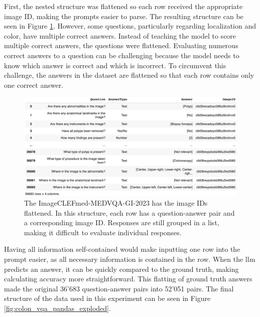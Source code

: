         First, the nested structure was flattened so each row received the appropriate image ID, making the prompts easier to parse. The resulting structure can be seen in Figure \ref{fig:colon_vqa_pandas}. However, some questions, particularly regarding localization and color, have multiple correct answers. Instead of teaching the model to score multiple correct answers, the questions were flattened. Evaluating numerous correct answers to a question can be challenging because the model needs to know which answer is correct and which is incorrect. To circumvent this challenge, the answers in the dataset are flattened so that each row contains only one correct answer.

        \begin{figure}[htb]
            \centering
            \centerline{
            \includegraphics[width=1.2\textwidth]{images/colon_vqa_pandas.png}}
            \caption{The ImageCLEFmed-MEDVQA-GI-2023 has the image IDs flattened. In this structure, each row has a question-answer pair and a corresponding image ID. Responses are still grouped in a list, making it difficult to evaluate individual responses.}
            \label{fig:colon_vqa_pandas}
        \end{figure}

        Having all information self-contained would make inputting one row into the prompt easier, as all necessary information is contained in the row. 
        When the \gls{llm} predicts an answer, it can be quickly compared to the ground truth, making calculating accuracy more straightforward.
        This flatting of ground truth answers made the original 36'683 question-answer pairs into 52'051 pairs.
        The final structure of the data used in this experiment can be seen in Figure \ref{fig:colon_vqa_pandas_exploded}.

